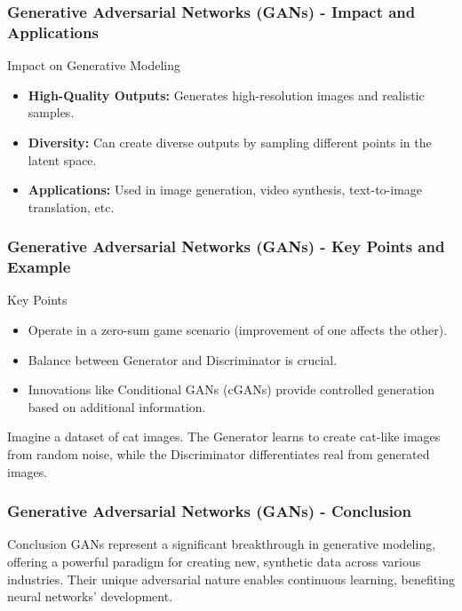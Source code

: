 \documentclass[aspectratio=169]{beamer}
\begin{document}
\begin{frame}[fragile]
    \frametitle{Generative Adversarial Networks (GANs) - Impact and Applications}
    \begin{block}{Impact on Generative Modeling}
        \begin{itemize}
            \item \textbf{High-Quality Outputs:} Generates high-resolution images and realistic samples.
            \item \textbf{Diversity:} Can create diverse outputs by sampling different points in the latent space.
            \item \textbf{Applications:} Used in image generation, video synthesis, text-to-image translation, etc.
        \end{itemize}
    \end{block}
\end{frame}

\begin{frame}[fragile]
    \frametitle{Generative Adversarial Networks (GANs) - Key Points and Example}
    \begin{block}{Key Points}
        \begin{itemize}
            \item Operate in a zero-sum game scenario (improvement of one affects the other).
            \item Balance between Generator and Discriminator is crucial.
            \item Innovations like Conditional GANs (cGANs) provide controlled generation based on additional information.
        \end{itemize}
    \end{block}
    \begin{example}
        Imagine a dataset of cat images. The Generator learns to create cat-like images from random noise, while the Discriminator differentiates real from generated images.
    \end{example}
\end{frame}

\begin{frame}[fragile]
    \frametitle{Generative Adversarial Networks (GANs) - Conclusion}
    \begin{block}{Conclusion}
        GANs represent a significant breakthrough in generative modeling, offering a powerful paradigm for creating new, synthetic data across various industries. Their unique adversarial nature enables continuous learning, benefiting neural networks' development.
    \end{block}
\end{frame}
\end{document}
